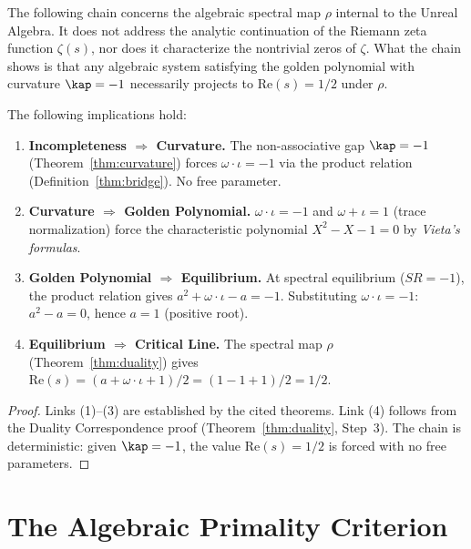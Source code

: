 \begin{remark}
The following chain concerns the algebraic spectral map $\rho$ internal to the Unreal Algebra. It does not address the analytic continuation of the Riemann zeta function $\zeta(s)$, nor does it characterize the nontrivial zeros of $\zeta$. What the chain shows is that any algebraic system satisfying the golden polynomial with curvature $\kap = -1$ necessarily projects to $\mathrm{Re}(s) = 1/2$ under $\rho$.
\end{remark}

\begin{theorem}\label{thm:spectral-chain}
The following implications hold:
\begin{enumerate}
\item \textbf{Incompleteness $\Rightarrow$ Curvature.} The non-associative gap $\kap = -1$ (Theorem~\ref{thm:curvature}) forces $\omega \cdot \iota = -1$ via the product relation (Definition~\ref{thm:bridge}). No free parameter.
\item \textbf{Curvature $\Rightarrow$ Golden Polynomial.} $\omega \cdot \iota = -1$ and $\omega + \iota = 1$ (trace normalization) force the characteristic polynomial $X^2 - X - 1 = 0$ by \emph{Vieta's formulas}.
\item \textbf{Golden Polynomial $\Rightarrow$ Equilibrium.} At spectral equilibrium ($SR = -1$), the product relation gives $a^2 + \omega \cdot \iota - a = -1$. Substituting $\omega \cdot \iota = -1$: $a^2 - a = 0$, hence $a = 1$ (positive root).
\item \textbf{Equilibrium $\Rightarrow$ Critical Line.} The spectral map $\rho$ (Theorem~\ref{thm:duality}) gives $\mathrm{Re}(s) = (a + \omega \cdot \iota + 1)/2 = (1 - 1 + 1)/2 = 1/2$.
\end{enumerate}
\end{theorem}

\begin{proof}
Links (1)--(3) are established by the cited theorems. Link (4) follows from the Duality Correspondence proof (Theorem~\ref{thm:duality}, Step~3). The chain is deterministic: given $\kap = -1$, the value $\mathrm{Re}(s) = 1/2$ is forced with no free parameters. \qedhere
\end{proof}



\section{The Algebraic Primality Criterion}


